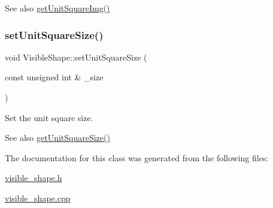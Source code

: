 \begin{DoxySeeAlso}{See also}
\mbox{\hyperlink{class_visible_shape_ab62a8320e8084bfdcc43b5c3cf072cd3}{get\+Unit\+Square\+Img()}} 
\end{DoxySeeAlso}
\mbox{\label{class_visible_shape_a52308c3c9134514fb6782c6f0e149914}} 
\subsubsection{\texorpdfstring{set\+Unit\+Square\+Size()}{setUnitSquareSize()}}
{\footnotesize\ttfamily void Visible\+Shape\+::set\+Unit\+Square\+Size (\begin{DoxyParamCaption}\item[{const unsigned int \&}]{\+\_\+size }\end{DoxyParamCaption})\hspace{0.3cm}{\ttfamily [virtual]}}



Set the unit square size. 

\begin{DoxySeeAlso}{See also}
\mbox{\hyperlink{class_visible_shape_a76955574eac9a5e205a2746b1343deb4}{get\+Unit\+Square\+Size()}} 
\end{DoxySeeAlso}


The documentation for this class was generated from the following files\+:\begin{DoxyCompactItemize}
\item 
\mbox{\hyperlink{visible__shape_8h}{visible\+\_\+shape.\+h}}\item 
\mbox{\hyperlink{visible__shape_8cpp}{visible\+\_\+shape.\+cpp}}\end{DoxyCompactItemize}

